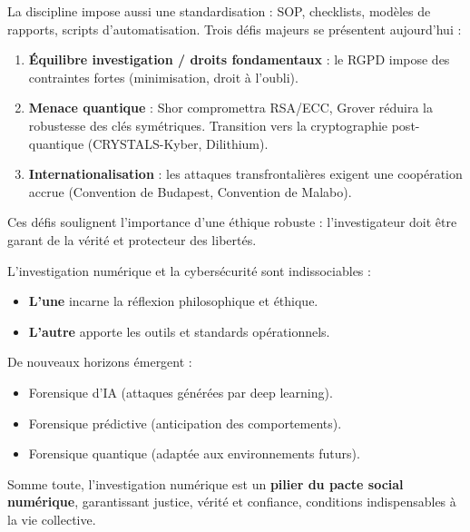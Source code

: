 \documentclass[12pt,a4paper]{report}
\begin{document}
{La discipline impose aussi une standardisation : SOP, checklists, modèles de rapports, scripts d’automatisation. Trois défis majeurs se présentent aujourd’hui :  

\begin{enumerate}
    \item \textbf{Équilibre investigation / droits fondamentaux} : le RGPD impose des contraintes fortes (minimisation, droit à l’oubli).  
    \item \textbf{Menace quantique} : Shor compromettra RSA/ECC, Grover réduira la robustesse des clés symétriques. 
    Transition vers la cryptographie post-quantique (CRYSTALS-Kyber, Dilithium).  
    \item \textbf{Internationalisation} : les attaques transfrontalières exigent une coopération accrue (Convention de Budapest, Convention de Malabo).  
\end{enumerate}

Ces défis soulignent l’importance d’une éthique robuste : l’investigateur doit être garant de la vérité et protecteur des libertés.

L’investigation numérique et la cybersécurité sont indissociables :  

\begin{itemize}
    \item \textbf{L’une} incarne la réflexion philosophique et éthique.  
    \item \textbf{L’autre} apporte les outils et standards opérationnels.  
\end{itemize}

De nouveaux horizons émergent :  
\begin{itemize}
    \item Forensique d’IA (attaques générées par deep learning).  
    \item Forensique prédictive (anticipation des comportements).  
    \item Forensique quantique (adaptée aux environnements futurs).  
\end{itemize}

\bigskip
Somme toute, l’investigation numérique est un \textbf{pilier du pacte social numérique}, garantissant justice, vérité et confiance, conditions indispensables à la vie collective.

}
\end{document}
